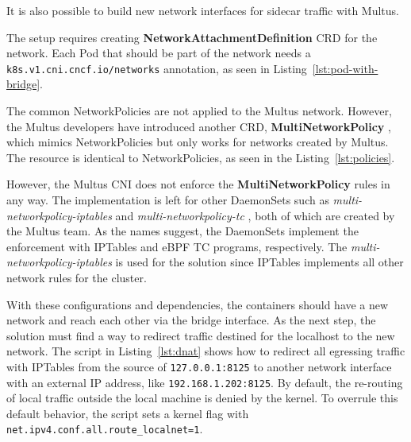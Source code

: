 \documentclass[english, 12pt, a4paper, sci, utf8, a-2b, online]{aaltothesis}
\begin{document}
It is also possible to build new network interfaces for sidecar traffic with Multus.



The setup requires creating \textbf{NetworkAttachmentDefinition} CRD for the network.
Each Pod that should be part of the network needs a \lstinline{k8s.v1.cni.cncf.io/networks} annotation, as seen in Listing~\ref{lst:pod-with-bridge}.



The common NetworkPolicies are not applied to the Multus network.
However, the Multus developers have introduced another CRD, \textbf{MultiNetworkPolicy} \cite{multi-network-policy}, which mimics NetworkPolicies but only works for networks created by Multus.
The resource is identical to NetworkPolicies, as seen in the Listing~\ref{lst:policies}.



However, the Multus CNI does not enforce the \textbf{MultiNetworkPolicy} rules in any way.
The implementation is left for other DaemonSets such as \emph{multi-networkpolicy-iptables} \cite{multi-network-policy-iptables} and \emph{multi-networkpolicy-tc} \cite{multi-network-policy-tc}, both of which are created by the Multus team.
As the names suggest, the DaemonSets implement the enforcement with IPTables and eBPF TC programs, respectively.
The \emph{multi-networkpolicy-iptables} is used for the solution since IPTables implements all other network rules for the cluster.


With these configurations and dependencies, the containers should have a new network and reach each other via the bridge interface.
As the next step, the solution must find a way to redirect traffic destined for the localhost to the new network.
The script in Listing~\ref{lst:dnat} shows how to redirect all egressing traffic with IPTables from the source of \lstinline{127.0.0.1:8125} to another network interface with an external IP address, like \lstinline{192.168.1.202:8125}.
By default, the re-routing of local traffic outside the local machine is denied by the kernel.
To overrule this default behavior, the script sets a kernel flag with \lstinline{net.ipv4.conf.all.route_localnet=1}.
\end{document}
